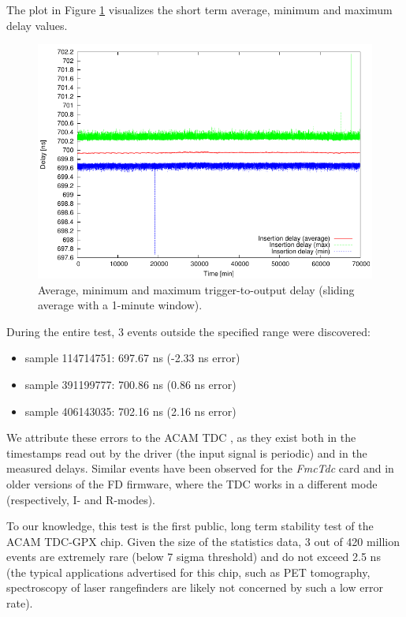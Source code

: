 \documentclass{article}
\begin{document}
The plot in Figure \ref{fig:plot_average} visualizes the short term average, minimum and maximum delay values. 

\begin{figure}[htb]
\centering
\includegraphics[width=13cm]{drawings/plot_average}
\caption{Average, minimum and maximum trigger-to-output delay (sliding average with a 1-minute window).}
\label{fig:plot_average}
\end{figure}

During the entire test, 3 events outside the specified range were discovered:
\begin{itemize}
\item sample 114714751: 697.67 ns (-2.33 ns error)
\item sample 391199777: 700.86 ns (0.86 ns error)
\item sample 406143035: 702.16 ns (2.16 ns error)
\end{itemize}

We attribute these errors to the ACAM TDC \cite{acam}, as they exist both in the timestamps read out by the driver (the input signal is periodic) and in the measured delays. Similar events have been observed
for the \emph{FmcTdc} card \cite{fmctdc} and in older versions of the FD firmware, where the TDC works in a different mode (respectively, I- and R-modes).

To our knowledge, this test is the first public, long term stability test of the ACAM TDC-GPX chip. Given the size of the statistics data, 3 out of 420 million events are extremely rare (below 7 sigma threshold) and do not exceed
2.5 ns (the typical applications advertised for this chip, such as PET tomography, spectroscopy of laser rangefinders are likely not concerned by such a low error rate).
\end{document}
